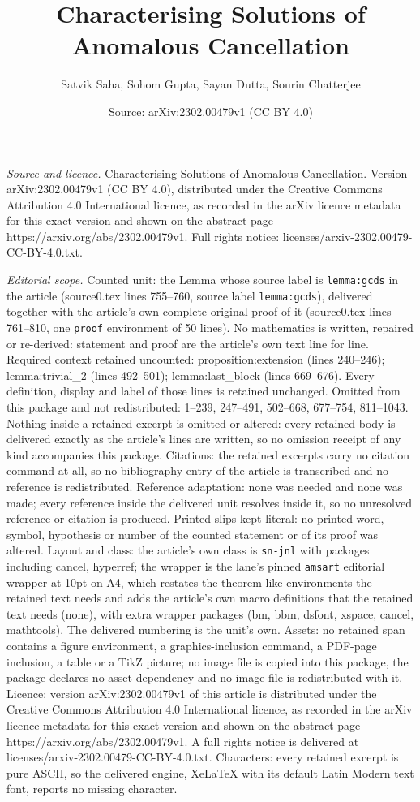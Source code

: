 \documentclass[10pt,a4paper]{amsart}
\title[Characterising Solutions of Anomalous Cancellation]{Characterising Solutions of Anomalous Cancellation}
\author{Satvik Saha, Sohom Gupta, Sayan Dutta, Sourin Chatterjee}
\date{Source: arXiv:2302.00479v1 (CC BY 4.0)}
\begin{document}
\maketitle

\noindent\emph{Source and licence.} Characterising Solutions of Anomalous Cancellation. Version arXiv:2302.00479v1 (CC BY 4.0), distributed under the Creative Commons Attribution 4.0 International licence, as recorded in the arXiv licence metadata for this exact version and shown on the abstract page https://arxiv.org/abs/2302.00479v1. Full rights notice: licenses/arxiv-2302.00479-CC-BY-4.0.txt.\par\smallskip

\noindent\textit{Editorial scope.} Counted unit: the Lemma whose source label is \texttt{lemma:gcds} in the article (source0.tex lines 755--760, source label \texttt{lemma:gcds}), delivered together with the article's own complete original proof of it (source0.tex lines 761--810, one \texttt{proof} environment of 50 lines). No mathematics is written, repaired or re-derived: statement and proof are the article's own text line for line. Required context retained uncounted: proposition:extension (lines 240--246); lemma:trivial\_2 (lines 492--501); lemma:last\_block (lines 669--676). Every definition, display and label of those lines is retained unchanged. Omitted from this package and not redistributed: 1--239, 247--491, 502--668, 677--754, 811--1043. Nothing inside a retained excerpt is omitted or altered: every retained body is delivered exactly as the article's lines are written, so no omission receipt of any kind accompanies this package. Citations: the retained excerpts carry no citation command at all, so no bibliography entry of the article is transcribed and no reference is redistributed. Reference adaptation: none was needed and none was made; every reference inside the delivered unit resolves inside it, so no unresolved reference or citation is produced. Printed slips kept literal: no printed word, symbol, hypothesis or number of the counted statement or of its proof was altered. Layout and class: the article's own class is \texttt{sn-jnl} with packages including cancel, hyperref; the wrapper is the lane's pinned \texttt{amsart} editorial wrapper at 10pt on A4, which restates the theorem-like environments the retained text needs and adds the article's own macro definitions that the retained text needs (none), with extra wrapper packages (bm, bbm, dsfont, xspace, cancel, mathtools). The delivered numbering is the unit's own. Assets: no retained span contains a figure environment, a graphics-inclusion command, a PDF-page inclusion, a table or a TikZ picture; no image file is copied into this package, the package declares no asset dependency and no image file is redistributed with it. Licence: version arXiv:2302.00479v1 of this article is distributed under the Creative Commons Attribution 4.0 International licence, as recorded in the arXiv licence metadata for this exact version and shown on the abstract page https://arxiv.org/abs/2302.00479v1. A full rights notice is delivered at licenses/arxiv-2302.00479-CC-BY-4.0.txt. Characters: every retained excerpt is pure ASCII, so the delivered engine, XeLaTeX with its default Latin Modern text font, reports no missing character.
\end{document}
